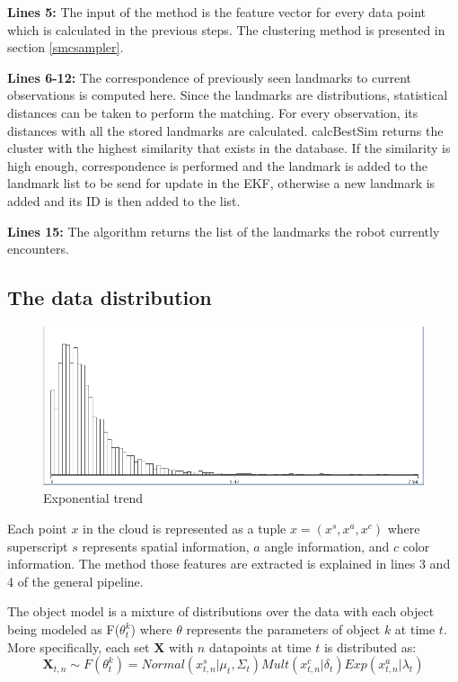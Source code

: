 \documentclass[twoside,hidelinks]{article}
\begin{document}
\textbf{Lines 5:} The input of the method is the feature vector for every data point which is calculated in the previous steps. The clustering method is presented in section \ref{smcsampler}. 

\textbf{Lines 6-12:} The correspondence of previously seen landmarks to current observations is computed here. Since the landmarks are distributions, statistical distances can be taken to perform the matching. For every observation, its distances with all the stored landmarks are calculated. calcBestSim returns the cluster with the highest similarity that exists in the database. If the similarity is high enough, correspondence is performed and the landmark is added to the landmark list to be send for update in the EKF, otherwise a new landmark is added and its ID is then added to the list.

\textbf{Lines 15:} The algorithm returns the list of the landmarks the robot currently encounters.

\subsection{The data distribution}
\label{data:dist}

\begin{figure}
    \centering
    \includegraphics[width=.35\textwidth]{Kullback-Leibler}
    \caption{Exponential trend}
    \label{pcl:kl}
\end{figure}

Each point $x$ in the cloud is represented as a tuple $x =(x^s, x^a, x^c ) $ where superscript $s$ represents spatial information, $a$ angle information, and $c$ color information. The method those features are extracted is explained in lines 3 and 4 of the general pipeline.

The object model is a mixture of distributions over the data with each object being modeled as F($\theta_t^k$) where $\theta$ represents the parameters of object $k$ at time $t$. More specifically, each set \textbf{X} with $n$ datapoints at time $t$ is distributed as:
$$ \textbf{X}_{t,n} \sim F(\theta_t^k) = Normal(x_{t,n}^s| \mu_t, \Sigma_t) Mult(x_{t,n}^c | \delta_t) Exp(x_{t,n}^a | \lambda_t) $$
\end{document}
